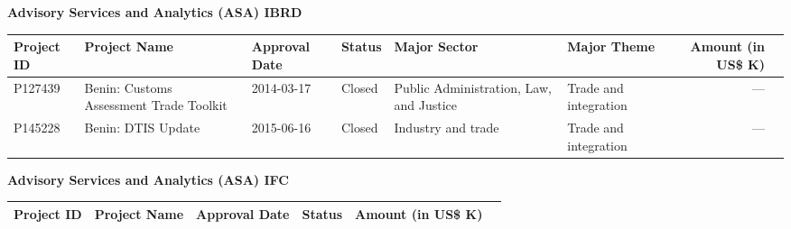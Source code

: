 \documentclass{article}\usepackage[]{graphicx}\usepackage[]{color}
\begin{document}
\begin{minipage}[b]{0.99\textwidth}
\begin{minipage}[b]{0.99\textwidth}
\begin{minipage}[c]{0.99\textwidth}
     \vspace*{0.5cm}
     \end{minipage}
     
     \begin{minipage}[c]{0.99\textwidth} %
     \raggedright{\color{white!30!blue} \textbf{\large Advisory Services and Analytics (ASA) IBRD}}
     \vspace*{0.5cm}
     
{\footnotesize
\begin{tabular}{l>{\raggedright}p{1in}ll>{\raggedright}p{1in}>{\raggedright}p{1in}rl}
 Project ID & Project Name & Approval Date & Status & Major Sector & Major Theme & Amount (in US\$ K) &  \\ 
  \hline
P127439 & Benin: Customs Assessment Trade Toolkit & 2014-03-17 & Closed & Public Administration, Law, and Justice & Trade and integration & --- &  \\ 
  P145228 & Benin: DTIS Update & 2015-06-16 & Closed & Industry and trade & Trade and integration & --- &  \\ 
  \end{tabular}
}

     \vspace*{0.5cm}
     \end{minipage}
     
     \begin{minipage}[c]{0.99\textwidth} %
     \raggedright{\color{white!30!blue} \textbf{\large Advisory Services and Analytics (ASA) IFC}}
     \vspace*{0.5cm}
     
{\small
\begin{tabular}{l>{\raggedright}p{2.5in}llrl}
 Project ID & Project Name & Approval Date & Status & Amount (in US\$ K) &  \\ 
  \hline
\end{tabular}
}

     \vspace*{0.5cm}
     \end{minipage}
     
    \end{minipage}
\end{minipage}
 
\end{document}
